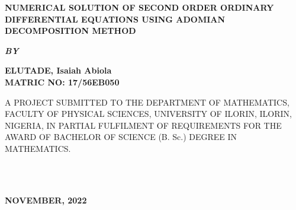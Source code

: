 \documentclass[11pt]{report}
\newcommand{\bt}[1]{\textbf{#1}}
\begin{document}
	
	\clearpage
	\thispagestyle{empty}
	\begin{center}
		\Large \bt{NUMERICAL SOLUTION OF SECOND ORDER ORDINARY DIFFERENTIAL EQUATIONS USING ADOMIAN DECOMPOSITION METHOD}
	\end{center}

	\hspace{7cm}
	
	\begin{center}
		\textbf{\textit{BY}}
	\end{center}
	
	\hspace{5cm}
	
	\begin{center}
		\large \textbf{ELUTADE, Isaiah Abiola
			\\
			MATRIC NO: 17/56EB050}
	\end{center}
	
	\hspace{9cm}
	
	\begin{center}
		A PROJECT SUBMITTED TO THE DEPARTMENT OF MATHEMATICS, FACULTY OF PHYSICAL SCIENCES, UNIVERSITY OF ILORIN, ILORIN, NIGERIA, IN PARTIAL FULFILMENT OF REQUIREMENTS FOR THE AWARD OF BACHELOR OF SCIENCE (B. Sc.) DEGREE IN MATHEMATICS.
	\end{center}

	\hspace{7cm}
	
%	
~~~~~~
	\\ \\ 
	\begin{center}
		\textbf{NOVEMBER, 2022}
	\end{center}

	\newpage
\end{document}
